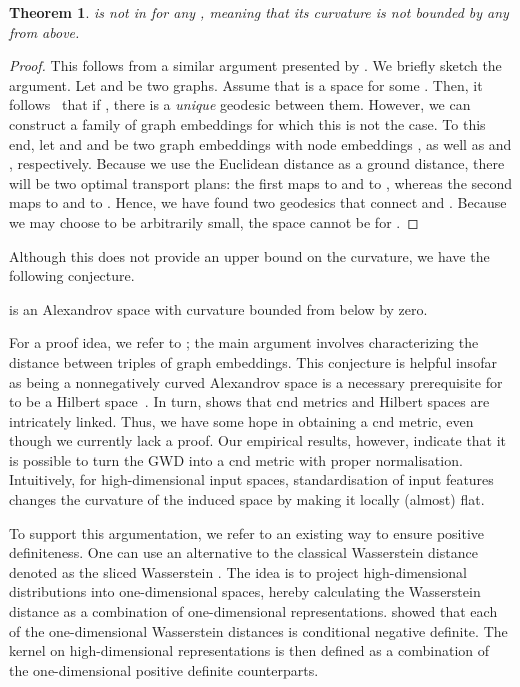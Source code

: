 \documentclass{article}
\newtheorem{theorem}{Theorem}
\begin{document}
\begin{theorem}
 is not in  for any , meaning that its curvature is \emph{not} bounded by any  from above.
\end{theorem}
\begin{proof}
  This follows from a similar argument presented by \citet{Turner2014}. We briefly sketch the argument.
Let  and  be two graphs.
  Assume that  is a  space for some .
Then, it follows~\citep[Proposition 2.11, p.\ 23]{bridson2013metric} that if 
  , there is a \emph{unique} geodesic between them. However, we can construct a family of graph embeddings for which this is not the case. To this end, let  and  and  be two graph embeddings with node embeddings ,  as well as  and , respectively. Because we use the Euclidean distance as a ground distance, there will be two optimal transport plans: the first maps  to  and  to , whereas the second maps  to  and  to . Hence, we have found two geodesics that connect  and . Because we may choose  to be arbitrarily small, the space cannot be  for .
\end{proof}
Although this does not provide an upper bound on the curvature, we have the following conjecture.
\begin{conjecture}
 is an Alexandrov space with curvature bounded from below by zero.
\end{conjecture}
For a proof idea, we refer to \citet{Turner2014}; the main argument involves characterizing the distance between triples of graph embeddings. This conjecture is helpful insofar as being a nonnegatively curved Alexandrov space is a necessary prerequisite for  to be a Hilbert space~\citep{Shin-Ichi2012}. In turn, \citet{feragen2015geodesic} shows that cnd metrics and Hilbert spaces are intricately linked. 
Thus, we have some hope in obtaining a cnd metric, even though we currently lack a proof.
Our empirical results, however, indicate that it is possible to turn the GWD into a cnd metric with proper normalisation. 
Intuitively, for high-dimensional input spaces, standardisation of input features changes the curvature of the induced space by making it locally (almost) flat.

To support this argumentation, we refer to an existing way to ensure positive definiteness. One can use an alternative to the classical Wasserstein distance denoted as the sliced Wasserstein \citep{rabin2011wasserstein}. The idea is to project high-dimensional distributions into one-dimensional spaces, hereby calculating the Wasserstein distance as a combination of one-dimensional representations. 
\citet{kolouri2016sliced} showed that each of the one-dimensional Wasserstein distances is conditional negative definite.
The kernel on high-dimensional representations is then defined as a combination of the one-dimensional positive definite counterparts. 
\end{document}

